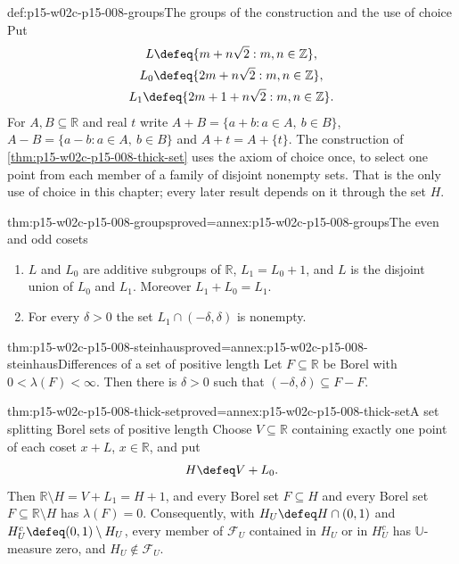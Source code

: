 \begin{hbconvention}{def:p15-w02c-p15-008-groups}{The groups of the construction and the use of choice}
Put
\[
 \begin{gathered}
 L\defeq\{m+n\sqrt2:m,n\in\mathbb Z\},\\
 L_0\defeq\{2m+n\sqrt2:m,n\in\mathbb Z\},\\
 L_1\defeq\{2m+1+n\sqrt2:m,n\in\mathbb Z\}.
 \end{gathered}
\]
For \(A,B\subseteq\mathbb R\) and real \(t\) write
\(A+B=\{a+b:a\in A,\ b\in B\}\), \(A-B=\{a-b:a\in A,\ b\in B\}\) and
\(A+t=A+\{t\}\). The construction of \cref{thm:p15-w02c-p15-008-thick-set}
uses the axiom of choice once, to select one point from each member of
a family of disjoint nonempty sets. That is the only use of choice in
this chapter; every later result depends on it through the set \(H\).
\end{hbconvention}

\begin{hblemma}{thm:p15-w02c-p15-008-groups}{proved=annex:p15-w02c-p15-008-groups}{The even and odd cosets}
\begin{enumerate}
\item \(L\) and \(L_0\) are additive subgroups of \(\mathbb R\),
      \(L_1=L_0+1\), and \(L\) is the disjoint union of \(L_0\) and
      \(L_1\). Moreover \(L_1+L_0=L_1\).
\item For every \(\delta>0\) the set \(L_1\cap(-\delta,\delta)\) is
      nonempty.
\end{enumerate}
\end{hblemma}

\begin{hblemma}{thm:p15-w02c-p15-008-steinhaus}{proved=annex:p15-w02c-p15-008-steinhaus}{Differences of a set of positive length}
Let \(F\subseteq\mathbb R\) be Borel with \(0<\lambda(F)<\infty\).
Then there is \(\delta>0\) such that \((-\delta,\delta)\subseteq F-F\).
\end{hblemma}

\begin{hbtheorem}{thm:p15-w02c-p15-008-thick-set}{proved=annex:p15-w02c-p15-008-thick-set}{A set splitting Borel sets of positive length}
Choose \(V\subseteq\mathbb R\) containing exactly one point of each coset
\(x+L\), \(x\in\mathbb R\), and put
\[
 H\defeq V+L_0 .
\]
Then \(\mathbb R\setminus H=V+L_1=H+1\), and every Borel set
\(F\subseteq H\) and every Borel set \(F\subseteq\mathbb R\setminus H\)
has \(\lambda(F)=0\). Consequently, with
\(H_U\defeq H\cap(0,1)\) and \(H_U^c\defeq(0,1)\setminus H_U\), every
member of \(\mathcal F_U\) contained in \(H_U\) or in \(H_U^c\) has
\(\mathbb U\)-measure zero, and \(H_U\notin\mathcal F_U\).
\end{hbtheorem}

